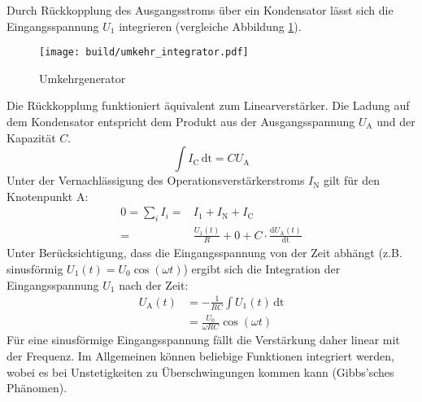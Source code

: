 Durch Rückkopplung des Ausgangsstroms über ein Kondensator lässt sich die
Eingangsspannung $U_1$ integrieren (vergleiche Abbildung \ref{fig:integrator}).
\begin{figure}[ht]
		\centering
		\texttt{[image: build/umkehr\_integrator.pdf]}
		\caption{Umkehrgenerator \cite{anleitung}}
		\label{fig:integrator}
\end{figure}
Die Rückkopplung funktioniert äquivalent zum Linearverstärker.
Die Ladung auf dem Kondensator entspricht dem Produkt aus der Ausgangsspannung
$U_\text{A}$ und der Kapazität $C$.
\begin{equation}
		\int I_\text{C} \, \text{dt} = C U_\text{A}
\end{equation}
Unter der Vernachlässigung des Operationsverstärkerstroms $I_\text{N}$ gilt
für den Knotenpunkt A:
\begin{align}
		0 = \sum_i I_i =& I_1 + I_\text{N} + I_\text{C} \nonumber \\
		=& \frac{U_1(t)}{R} + 0 + C \cdot \frac{\text{d} U_\text{A}(t)}{\text{dt}}
\end{align}
Unter Berücksichtigung, dass die Eingangsspannung von der Zeit abhängt (z.B.
sinusförmig $U_1(t)= U_0 \cos(\omega t)$) ergibt sich die Integration der Eingangsspannung $U_1$ nach der Zeit:
\begin{align}
  U_\text{A}(t) &= - \frac{1}{RC} \int U_\text{1}(t) \, \text{dt} \label{eq:integrator_before} \\
                  &= \frac{U_0}{\omega R C} \cos (\omega t) \label{eq:integrator}
\end{align}
Für eine sinusförmige Eingangsspannung fällt die Verstärkung daher linear mit
der Frequenz.
Im Allgemeinen können beliebige Funktionen integriert werden, wobei es bei
Unstetigkeiten zu Überschwingungen kommen kann (Gibbs'sches Phänomen).

